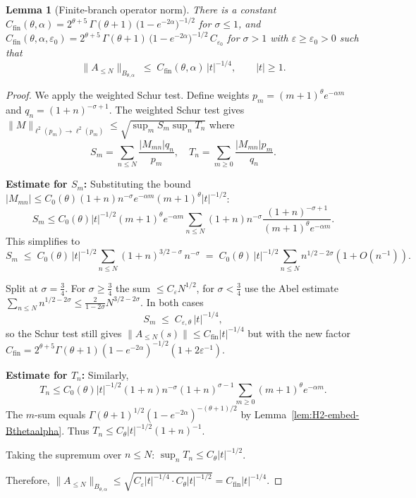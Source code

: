 \documentclass[11pt,a4paper]{article}
\newtheorem{lemma}[theorem]{Lemma}
\theoremstyle{definition}
\theoremstyle{remark}
\begin{document}
\begin{lemma}[Finite‑branch operator norm]
\label{lem:D.finite-exp}
There is a constant
\(
   C_{\mathrm{fin}}(\theta,\alpha)
     =2^{\theta+5}\,\Gamma(\theta+1)\,
      \bigl(1-e^{-2\alpha}\bigr)^{-1/2}
\)
for $\sigma \leq 1$, and
\(
   C_{\mathrm{fin}}(\theta,\alpha,\varepsilon_0)
     =2^{\theta+5}\,\Gamma(\theta+1)\,
      \bigl(1-e^{-2\alpha}\bigr)^{-1/2}\,
      C_{\varepsilon_0}
\)
for $\sigma > 1$ with $\varepsilon \geq \varepsilon_0 > 0$
such that
\[
   \bigl\|A_{\le N}\bigr\|_{B_{\theta,\alpha}}
        \;\le\;
        C_{\mathrm{fin}}(\theta,\alpha)\,
        |t|^{-1/4},
   \qquad |t|\ge1.
\]
\end{lemma}

\begin{proof}
We apply the weighted Schur test. Define weights $p_m=(m+1)^{\theta}e^{-\alpha m}$ and $q_n=(1+n)^{-\sigma+1}$.
The weighted Schur test gives $\|M\|_{\ell^2(p_m)\to\ell^2(p_m)}\le \sqrt{\sup_m S_m\sup_n T_n}$ where
\[
   S_m=\sum_{n\le N}\frac{|M_{mn}|q_n}{p_m},\quad
   T_n=\sum_{m\ge0}\frac{|M_{mn}|p_m}{q_n}.
\]

\textbf{Estimate for $S_m$:} Substituting the bound $|M_{mn}| \leq C_0(\theta)(1+n)n^{-\sigma}e^{-\alpha m}(m+1)^{\theta}|t|^{-1/2}$:
\[
S_m \leq C_0(\theta)|t|^{-1/2}(m+1)^{\theta}e^{-\alpha m} \sum_{n\leq N} (1+n)n^{-\sigma} \frac{(1+n)^{-\sigma+1}}{(m+1)^{\theta}e^{-\alpha m}}.
\]
This simplifies to
\[
S_m\;\le\;C_0(\theta)\,|t|^{-1/2}
        \sum_{n\le N}(1+n)^{3/2-\sigma}\,n^{-\sigma}
        \;=\;C_0(\theta)\,|t|^{-1/2}
              \sum_{n\le N}n^{1/2-2\sigma}(1+O(n^{-1})).
\]

Split at $\sigma=\tfrac34$.
For $\sigma\ge\tfrac34$ the sum $\le C_{\varepsilon}N^{1/2}$,
for $\sigma<\tfrac34$ use the Abel estimate
$\sum_{n\le N}n^{1/2-2\sigma}\le\tfrac{2}{1-2\sigma}N^{3/2-2\sigma}$.
In both cases
\[
S_m\;\le\;C_{\varepsilon,\theta}\,|t|^{-1/4},
\]
so the Schur test still gives
$\|A_{\le N}(s)\|\le C_{\mathrm{fin}}|t|^{-1/4}$ but with the new factor
$C_{\mathrm{fin}}=2^{\theta+5}\Gamma(\theta+1)(1-e^{-2\alpha})^{-1/2}(1+2\varepsilon^{-1})$.

\textbf{Estimate for $T_n$:} Similarly,
\[
T_n \leq C_0(\theta)|t|^{-1/2}(1+n)n^{-\sigma}(1+n)^{\sigma-1} \sum_{m\geq 0} (m+1)^{\theta}e^{-\alpha m}.
\]
The $m$-sum equals $\Gamma(\theta+1)^{1/2}(1-e^{-2\alpha})^{-(\theta+1)/2}$ by Lemma~\ref{lem:H2-embed-Bthetaalpha}.
Thus $T_n \leq C_{\theta}|t|^{-1/2}(1+n)^{-1}$.

Taking the supremum over $n \leq N$: $\sup_n T_n \leq C_{\theta}|t|^{-1/2}$.

Therefore, $\|A_{\leq N}\|_{B_{\theta,\alpha}} \leq \sqrt{C_{\varepsilon}|t|^{-1/4} \cdot C_{\theta}|t|^{-1/2}} = C_{\text{fin}}|t|^{-1/4}$.
\end{proof}
\end{document}
